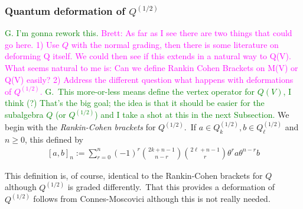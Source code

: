 \documentclass[12pt]{amsart}
\theoremstyle{plain}
\theoremstyle{definition}
\theoremstyle{remark}
\begin{document}
\subsubsection{Quantum deformation of $Q^{(1/2)}$} \textcolor{green}{G. I'm gonna rework this.} \textcolor{magenta}{Brett: As far as I see there are two things that could go here. 1) Use $Q$ with the normal grading, then there is some literature on deforming Q itself. We could then see if this extends in a natural way to Q(V). What seems natural to me is: Can we define Rankin Cohen Brackets on M(V) or Q(V) easily? 2) Address the different question what happens with deformations of $Q^{(1/2)}$. } \textcolor{green}{G.\ This more-or-less means define the vertex operator for $Q(V)$, I think (?) That's the big goal; the idea is that it should be easier for the subalgebra $Q$ (or $Q^{(1/2)}$) and I take a shot at this in the next Subsection. }We begin with the \textit{Rankin-Cohen brackets} for $Q^{(1/2)}$.\ If
$a\in Q^{(1/2)}_k, b\in Q^{(1/2)}_{\ell}$ and $n\geq 0$, this defined by
\begin{eqnarray}\label{SRCbrackets}
[a, b]_n := \sum_{r=0}^n  (-1)^r\binom{2k+n-1}{n-r}\binom{2\ell+n-1}{r}\theta^ra\theta^{n-r}b
\end{eqnarray}

\medskip
This definition is, of course, identical to the Rankin-Cohen brackets for $Q$ \cite{Zagier123} although $Q^{(1/2)}$ is graded differently.\ That this provides a deformation of $Q^{(1/2)}$ follows from   Connes-Moscovici \cite{CM} although this is not really needed.
\end{document}
